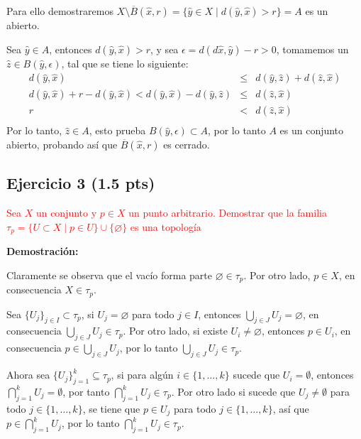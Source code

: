 \documentclass[
]{article}
\begin{document}
Para ello demostraremos
\(X \setminus \overline B(\hat{x},r)= \{ \hat{y} \in X \mid d(\hat{y},\hat{x}) > r\}= A\)
es un abierto.

Sea \(\hat{y} \in A\), entonces \(d(\hat{y},\hat{x})>r\), y sea
\(\epsilon=d(d\hat{x},\hat{y})-r>0\), tomamemos un
\(\hat{z} \in B(\hat{y}, \epsilon)\), tal que se tiene lo siguiente:
\begin{eqnarray*}
                           d(\hat{y},\hat{x}) & \leq & d(\hat{y},\hat{z}) + d(\hat{z},\hat{x})\\
        d(\hat{y},\hat{x}) +r - d(\hat{y},\hat{x}) < d(\hat{y},\hat{x}) - d(\hat{y},\hat{z}) & \leq & d(\hat{z},\hat{x})\\
                                              r & < & d(\hat{z},\hat{x})\\
\end{eqnarray*} Por lo tanto, \(\hat{z} \in A\), esto prueba
\(B(\hat{y}, \epsilon) \subset A\), por lo tanto \(A\) es un conjunto
abierto, probando así que \(\overline B(\hat{x},r)\) es cerrado.

\hypertarget{ejercicio-3-1.5-pts}{%
\subsection{Ejercicio 3 (1.5 pts)}\label{ejercicio-3-1.5-pts}}

\textcolor{red}{Sea $X$ un conjunto  y $p \in X$ un punto arbitrario. Demostrar que la familia $\tau_p = \{ U \subset X \;|\; p \in U \} \cup \{ \varnothing \}$ es una topología}

\textbf{Demostración:}

Claramente se observa que el vacío forma parte
\(\varnothing \in \tau_p\). Por otro lado, \(p \in X\), en consecuencia
\(X \in \tau_p\).

Sea \(\{U_j \}_{j \in I} \subset \tau_p\), si \(U_j= \varnothing\) para
todo \(j \in I\), entonces
\(\displaystyle \bigcup_{j \in J} U_j = \varnothing\), en consecuencia
\(\displaystyle\bigcup_{j \in J} U_j \in \tau_p\). Por otro lado, si
existe \(U_i \neq \varnothing\), entonces \(p \in U_i\), en consecuencia
\(p\in \displaystyle\bigcup_{j \in J} U_j\), por lo tanto
\(\displaystyle\bigcup_{j \in J} U_j \in \tau_p\).

Ahora sea \(\{U_j\}_{j=1}^k\subseteq \tau_p\), si para algún
\(i\in \{1,\ldots, k\}\) sucede que \(U_i=\emptyset\), entonces
\(\displaystyle\bigcap_{j=1}^k U_j=\emptyset\), por tanto
\(\displaystyle\bigcap_{j=1}^k U_j\in \tau_p\). Por otro lado si sucede
que \(U_j\ne \emptyset\) para todo \(j\in \{1,\ldots, k\}\), se tiene
que \(p\in U_j\) para todo \(j\in \{1,\ldots, k\}\), así que
\(p\in \displaystyle\bigcap_{j=1}^k U_j\), por lo tanto
\(\displaystyle\bigcap_{j=1}^k U_j\in \tau_p\).
\end{document}
